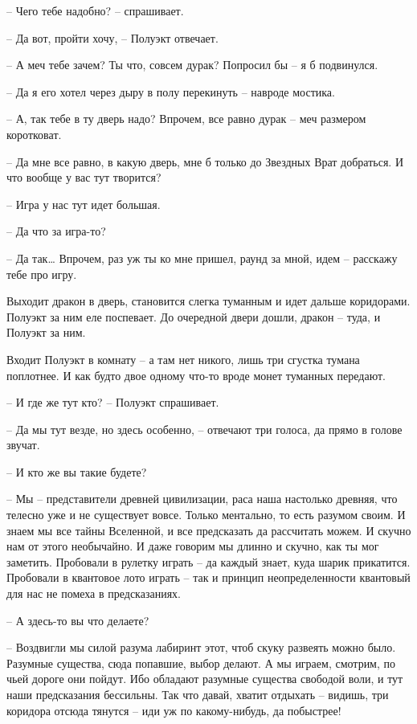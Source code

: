 \documentclass[ebook,oneside,final,openright]{memoir}
\begin{document}
\par
– Чего тебе надобно? – спрашивает.\par
– Да вот, пройти хочу, – Полуэкт отвечает.\par
– А меч тебе зачем? Ты что, совсем дурак? Попросил бы – я б подвинулся.\par
– Да я его хотел через дыру в полу перекинуть – навроде мостика.\par
– А, так тебе в ту дверь надо? Впрочем, все равно дурак – меч размером коротковат.\par
– Да мне все равно, в какую дверь, мне б только до Звездных Врат добраться. И что вообще у вас тут творится?\par
– Игра у нас тут идет большая.\par
– Да что за игра-то?\par
– Да так… Впрочем, раз уж ты ко мне пришел, раунд за мной, идем – расскажу тебе про игру.\par
\par
Выходит дракон в дверь, становится слегка туманным и идет дальше коридорами. Полуэкт за ним еле поспевает. До очередной двери дошли, дракон – туда, и Полуэкт за ним. \par
Входит Полуэкт в комнату – а там нет никого, лишь три сгустка тумана поплотнее. И как будто двое одному что-то вроде монет туманных передают.\par
– И где же тут кто? – Полуэкт спрашивает.\par
– Да мы тут везде, но здесь особенно, – отвечают три голоса, да прямо в голове звучат.\par
– И кто же вы такие будете?\par
– Мы – представители древней цивилизации, раса наша настолько древняя, что телесно уже и не существует вовсе. Только ментально, то есть разумом своим. И знаем мы все тайны Вселенной, и все предсказать да рассчитать можем. И скучно нам от этого необычайно. И даже говорим мы длинно и скучно, как ты мог заметить. Пробовали в рулетку играть – да каждый знает, куда шарик прикатится. Пробовали в квантовое лото играть – так и принцип неопределенности квантовый для нас не помеха в предсказаниях.\par
– А здесь-то вы что делаете?\par
– Воздвигли мы силой разума лабиринт этот, чтоб скуку развеять можно было. Разумные существа, сюда попавшие, выбор делают. А мы играем, смотрим, по чьей дороге они пойдут. Ибо обладают разумные существа свободой воли, и тут наши предсказания бессильны. Так что давай, хватит отдыхать – видишь, три коридора отсюда тянутся – иди уж по какому-нибудь, да побыстрее!\par
\end{document}
